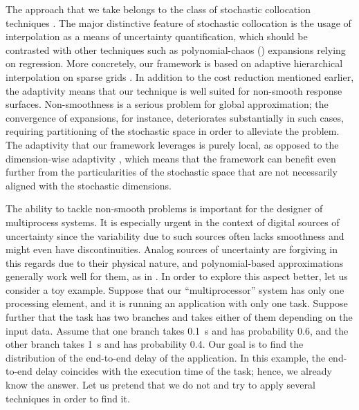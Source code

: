 The approach that we take belongs to the class of stochastic collocation
techniques \cite{xiu2010}. The major distinctive feature of stochastic
collocation is the usage of interpolation as a means of uncertainty
quantification, which should be contrasted with other techniques such as
polynomial-chaos () expansions relying on regression. More concretely,
our framework is based on adaptive hierarchical interpolation on sparse grids
\cite{klimke2006, ma2009}. In addition to the cost reduction mentioned earlier,
the adaptivity means that our technique is well suited for non-smooth response
surfaces. Non-smoothness is a serious problem for global approximation; the
convergence of  expansions, for instance, deteriorates substantially in
such cases, requiring partitioning of the stochastic space in order to alleviate
the problem. The adaptivity that our framework leverages is purely local, as
opposed to the dimension-wise adaptivity \cite{klimke2006}, which means that the
framework can benefit even further from the particularities of the stochastic
space that are not necessarily aligned with the stochastic dimensions.


The ability to tackle non-smooth problems is important for the designer of
multiprocess systems. It is especially urgent in the context of digital sources
of uncertainty since the variability due to such sources often lacks smoothness
and might even have discontinuities. Analog sources of uncertainty are forgiving
in this regards due to their physical nature, and polynomial-based
approximations generally work well for them, as in \cite{bhardwaj2008, lee2013,
ukhov2014, ukhov2015}. In order to explore this aspect better, let us consider a
toy example. Suppose that our ``multiprocessor'' system has only one processing
element, and it is running an application with only one task. Suppose further
that the task has two branches and takes either of them depending on the input
data. Assume that one branch takes 0.1~s and has probability 0.6, and the other
branch takes 1~s and has probability 0.4. Our goal is to find the distribution
of the end-to-end delay of the application. In this example, the end-to-end
delay coincides with the execution time of the task; hence, we already know the
answer. Let us pretend that we do not and try to apply several techniques in
order to find it.

